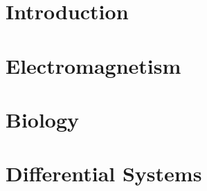\chapter*{Introduction} 

\chapter{Electromagnetism}


\chapter{Biology}


\chapter{Differential Systems}

